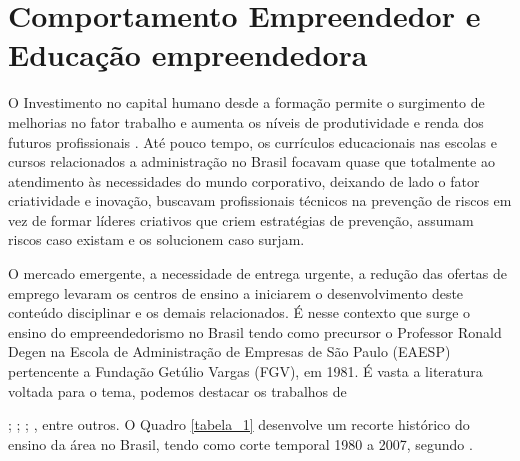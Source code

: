 \section{Comportamento Empreendedor e Educação empreendedora}


O Investimento no  capital  humano desde a formação permite o surgimento de melhorias no fator trabalho e aumenta os níveis de produtividade e renda dos futuros profissionais \cite{macedo_capital_2019}. Até pouco tempo, os currículos educacionais nas escolas e cursos relacionados a administração no Brasil focavam quase que totalmente ao atendimento às necessidades do mundo corporativo, deixando de lado o fator criatividade e inovação, buscavam profissionais técnicos na prevenção de riscos em vez de formar líderes criativos que criem estratégias de prevenção, assumam riscos caso existam \cite{sanna_evolution_1999} e os solucionem caso surjam. 

O mercado emergente, a necessidade de entrega urgente, a redução das ofertas de emprego levaram os centros de ensino a iniciarem o desenvolvimento deste conteúdo disciplinar e os demais relacionados. É nesse contexto que surge o ensino do empreendedorismo no Brasil tendo como precursor o Professor Ronald Degen \cite{koerner_designing_1990} na Escola de Administração de Empresas de São Paulo (EAESP) pertencente a Fundação Getúlio Vargas (FGV), em 1981. É vasta a literatura voltada para o tema, podemos destacar os trabalhos de  

; ; ; ,  entre outros. O Quadro \ref{tabela_1} desenvolve um recorte histórico do ensino da área no Brasil, tendo como corte temporal 1980 a 2007, segundo \cite{fernandes_breve_2013}. 



